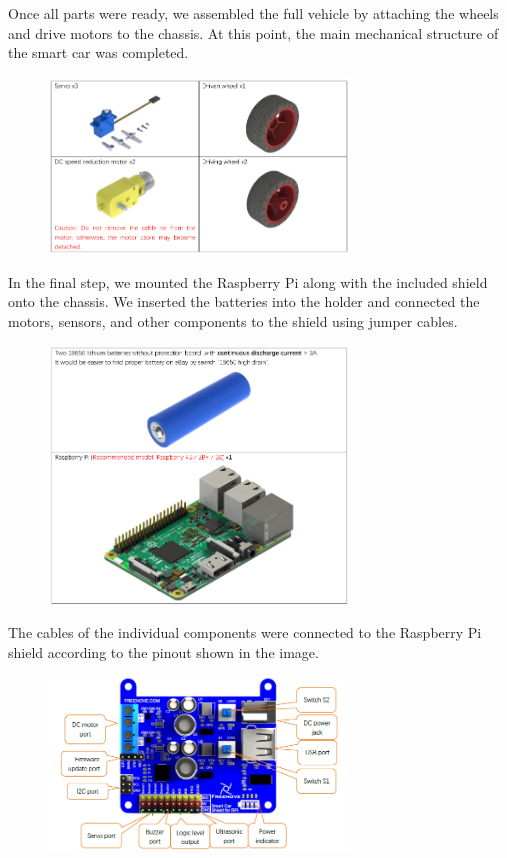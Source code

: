 Once all parts were ready, we assembled the full vehicle by attaching the wheels and drive motors to the chassis. At this point, the main mechanical structure of the smart car was completed.

\begin{figure}[H]
    \includegraphics[width=8cm]{img/engine_and_wheels}
\end{figure}

In the final step, we mounted the Raspberry Pi along with the included shield onto the chassis. We inserted the batteries into the holder and connected the motors, sensors, and other components to the shield using jumper cables.

\begin{figure}[H]
    \includegraphics[width=8cm]{img/rpi_and_battery}
\end{figure}

The cables of the individual components were connected to the Raspberry Pi shield according to the pinout shown in the image.

\begin{figure}[H]
    \includegraphics[width=8cm]{img/shield_pinout}
\end{figure}


